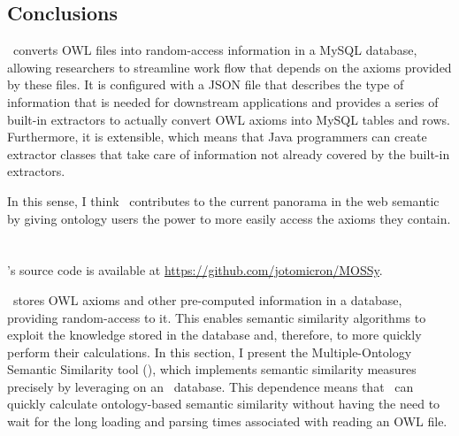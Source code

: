 

\subsection{Conclusions} \label{sub:owlsql/conclusion}

\owlsql\ converts OWL files into random-access information in a MySQL database, allowing researchers to streamline work flow that depends on the axioms provided by these files. It is configured with a JSON file that describes the type of information that is needed for downstream applications and provides a series of built-in extractors to actually convert OWL axioms into MySQL tables and rows. Furthermore, it is extensible, which means that Java programmers can create extractor classes that take care of information not already covered by the built-in extractors.

In this sense, I think \owlsql\ contributes to the current panorama in the web semantic by giving ontology users the power to more easily access the axioms they contain.



\newpage

\section{\mossy} \label{sec:technical/mossy}

\begin{note-paper}
    \mossy's source code is available at \url{https://github.com/jotomicron/MOSSy}.
\end{note-paper}

\owlsql\ stores OWL axioms and other pre-computed information in a database, providing random-access to it. This enables semantic similarity algorithms to exploit the knowledge stored in the database and, therefore, to more quickly perform their calculations. In this section, I present the Multiple-Ontology Semantic Similarity tool (\mossy), which implements semantic similarity measures precisely by leveraging on an \owlsql\ database. This dependence means that \mossy\ can quickly calculate ontology-based semantic similarity without having the need to wait for the long loading and parsing times associated with reading an OWL file.

